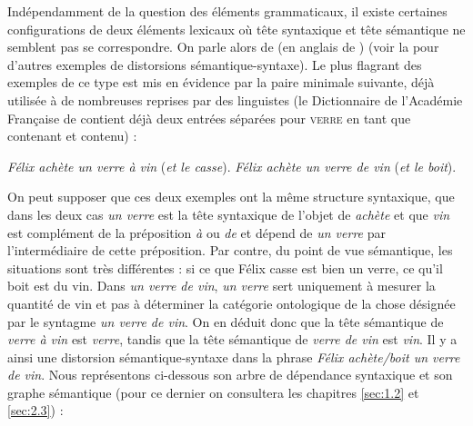     {Indépendamment de la question des éléments grammaticaux, il existe certaines configurations de deux éléments lexicaux où tête syntaxique et tête sémantique ne semblent pas se correspondre. On parle alors de  (en anglais de ) (voir la  pour d'autres exemples de distorsions sémantique-syntaxe). Le plus flagrant des exemples de ce type est mis en évidence par la paire minimale suivante, déjà utilisée à de nombreuses reprises par des linguistes (le Dictionnaire de l’Académie Française de \citeyear{academie1798dictionnaire} contient déjà deux entrées séparées pour \textsc{verre} en tant que contenant et contenu) :

    \ea
    \ea  \textit{Félix achète un verre à vin} (\textit{et le casse}).
    \ex  \textit{Félix achète un verre de vin} (\textit{et le boit}).\label{ex:3-3-24b}
    \z
    \z

    On peut supposer que ces deux exemples ont la même structure syntaxique, que dans les deux cas \textit{un verre} est la tête syntaxique de l’objet de \textit{achète} et que \textit{vin} est complément de la préposition \textit{à} ou \textit{de} et dépend de \textit{un verre} par l’intermédiaire de cette préposition. Par contre, du point de vue sémantique, les situations sont très différentes : si ce que Félix casse est bien un verre, ce qu’il boit est du vin. Dans \textit{un verre de vin}, \textit{un verre} sert uniquement à mesurer la quantité de vin et pas à déterminer la catégorie ontologique de la chose désignée par le syntagme \textit{un verre de vin}. On en déduit donc que la tête sémantique de \textit{verre à vin} est \textit{verre}, tandis que la tête sémantique de \textit{verre de vin} est \textit{vin}. Il y a ainsi une distorsion sémantique-syntaxe dans la phrase \textit{Félix achète/boit un verre de vin}. Nous représentons ci-dessous son arbre de dépendance syntaxique et son graphe sémantique (pour ce dernier on consultera les chapitres \ref{sec:1.2} et \ref{sec:2.3}) :

}
